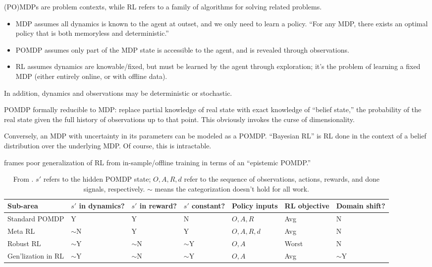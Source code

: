 \documentclass[notitlepage,openany,11pt]{report}
\theoremstyle{plain}%
\numberwithin{equation}{section}
\begin{document}
(PO)MDPs are problem contexts, while RL refers to a family of algorithms for solving related problems.
\begin{itemize}
\item MDP assumes all dynamics is known to the agent at outset, and we only need to learn a policy. ``For any MDP, there exists an optimal policy that is both memoryless and deterministic.''  
\item POMDP assumes only part of the MDP state is accessible to the agent, and is revealed through observations.
\item RL assumes dynamics are knowable/fixed, but must be learned by the agent through exploration; it's the problem of learning a fixed MDP (either entirely online, or with offline data).
\end{itemize}
In addition, dynamics and observations may be deterministic or stochastic. 

POMDP formally reducible to MDP: replace partial knowledge of real state with exact knowledge of ``belief state,'' the probability of the real state given the full history of observations up to that point. This obviously invokes the curse of dimensionality.

Conversely, an MDP with uncertainty in its parameters can be modeled as a POMDP. ``Bayesian RL'' is RL done in the context of a belief distribution over the underlying MDP. Of course, this is intractable.

\cite{GhoshEtAl:21} frames poor generalization of RL from in-sample/offline training in terms of an ``epistemic POMDP.''


\begin{table}[h!]
\centering
\begin{tabularx}{0.95\textwidth} { 
>{\raggedright\arraybackslash}X >{\raggedright\arraybackslash}X >{\raggedright\arraybackslash}X >{\raggedright\arraybackslash}X >{\raggedright\arraybackslash}X >{\raggedright\arraybackslash}X >{\raggedright\arraybackslash}X
}
\hline\hline
Sub-area & $s'$ in dynamics? & $s'$ in reward? & $s'$ constant? & Policy inputs & RL objective & Domain shift? \\
\hline\hline
Standard POMDP & Y & Y & N & $O, A, R$ & Avg & N \\ 
\hline
Meta RL & $\sim$N & Y & Y & $O, A, R, d$ & Avg & N \\ 
\hline
Robust RL & $\sim$Y & $\sim$N & $\sim$Y & $O, A$ & Worst & N \\ 
\hline
Gen'lization in RL & $\sim$Y & $\sim$N & $\sim$Y & $O, A$ & Avg &  $\sim$Y \\ 
\hline\hline
\end{tabularx}
\caption{From \cite{NiEtAl:21}. $s'$ refers to the hidden POMDP state; $O, A, R, d$ refer to the sequence of observations, actions, rewards, and done signals, respectively. $\sim$ means the categorization doesn't hold for all work.
}
\end{table}
\end{document}
